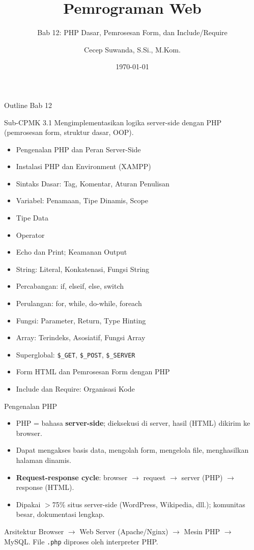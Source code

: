\documentclass[handout]{beamer}
\title[Bab 12 -- PHP Dasar]{Pemrograman Web}
\subtitle{Bab 12: PHP Dasar, Pemrosesan Form, dan Include/Require}
\author{Cecep Suwanda, S.Si., M.Kom.}
\institute{Universitas Bale Bandung}
\date{\today}
\begin{document}
\begin{frame}
	\titlepage
\end{frame}

\begin{frame}[shrink=20]{Outline Bab 12}
	\begin{block}{Sub-CPMK 3.1}
		Mengimplementasikan logika server-side dengan PHP (pemrosesan form, struktur dasar, OOP).
	\end{block}
	\begin{itemize}
		\item Pengenalan PHP dan Peran Server-Side
		\item Instalasi PHP dan Environment (XAMPP)
		\item Sintaks Dasar: Tag, Komentar, Aturan Penulisan
		\item Variabel: Penamaan, Tipe Dinamis, Scope
		\item Tipe Data
		\item Operator
		\item Echo dan Print; Keamanan Output
		\item String: Literal, Konkatenasi, Fungsi String
		\item Percabangan: if, elseif, else, switch
		\item Perulangan: for, while, do-while, foreach
		\item Fungsi: Parameter, Return, Type Hinting
		\item Array: Terindeks, Asosiatif, Fungsi Array
		\item Superglobal: \texttt{\$\_GET}, \texttt{\$\_POST}, \texttt{\$\_SERVER}
		\item Form HTML dan Pemrosesan Form dengan PHP
		\item Include dan Require: Organisasi Kode
	\end{itemize}
\end{frame}

\begin{frame}{Pengenalan PHP}
	\begin{itemize}
		\item PHP = bahasa \textbf{server-side}; dieksekusi di server, hasil (HTML) dikirim ke browser.
		\item Dapat mengakses basis data, mengolah form, mengelola file, menghasilkan halaman dinamis.
		\item \textbf{Request-response cycle}: browser $\to$ request $\to$ server (PHP) $\to$ response (HTML).
		\item Dipakai $>$75\% situs server-side (WordPress, Wikipedia, dll.); komunitas besar, dokumentasi lengkap.
	\end{itemize}
	\begin{block}{Arsitektur}
		Browser $\to$ Web Server (Apache/Nginx) $\to$ Mesin PHP $\to$ MySQL. File \texttt{.php} diproses oleh interpreter PHP.
	\end{block}
\end{frame}
\end{document}
